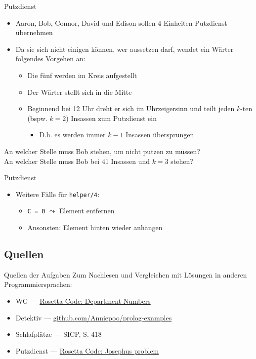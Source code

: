 \documentclass{beamer}
\begin{document}
\begin{frame}{Putzdienst}
	\begin{itemize}
		\item Aaron, Bob, Connor, David und Edison sollen 4 Einheiten Putzdienst übernehmen
		\item Da sie sich nicht einigen können, wer aussetzen darf, wendet ein Wärter folgendes Vorgehen an:
		\begin{itemize}
			\item Die fünf werden im Kreis aufgestellt
			\item Der Wärter stellt sich in die Mitte
			\item Beginnend bei 12 Uhr dreht er sich im Uhrzeigersinn und teilt jeden $k$-ten (bspw. $k = 2$) Insassen zum Putzdienst ein
			\begin{itemize}
				\item D.h. es werden immer $k - 1$ Insassen übersprungen
			\end{itemize}
		\end{itemize}
	\end{itemize}

	An welcher Stelle muss Bob stehen, um nicht putzen zu müssen?\\
	\pause
	An welcher Stelle muss Bob bei 41 Insassen und $k = 3$ stehen?
\end{frame}

\begin{frame}{Putzdienst}

	\begin{itemize}
		\item Weitere Fälle für \texttt{helper/4}:
		\begin{itemize}
			\item \texttt{C = 0} $\leadsto$ Element entfernen
			\item Ansonsten: Element hinten wieder anhängen
		\end{itemize}
	\end{itemize}
\end{frame}

\subsection{Quellen}

\begin{frame}{Quellen der Aufgaben}
	Zum Nachlesen und Vergleichen mit Lösungen in anderen Programmiersprachen:
	\begin{itemize}
		\item WG --- \href{https://rosettacode.org/wiki/Department_Numbers}{Rosetta Code: Department Numbers}
		\item Detektiv --- \href{https://github.com/Anniepoo/prolog-examples/blob/master/newdetective.pl}{github.com/Anniepoo/prolog-examples}
		\item Schlafplätze --- SICP, S. 418
		\item Putzdienst --- \href{https://rosettacode.org/wiki/Josephus_problem}{Rosetta Code: Josephus problem}
	\end{itemize}
\end{frame}
\end{document}
